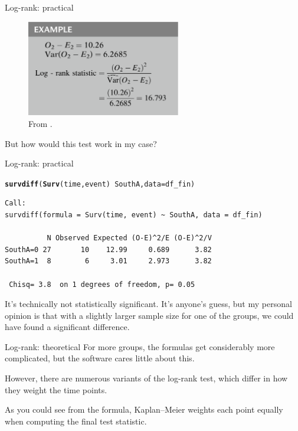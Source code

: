 \documentclass[12pt,english,pdf,xcolor=dvipsnames,aspectratio=169]{beamer}\usepackage[]{graphicx}\usepackage[]{xcolor}
\makeatletter
\newcommand{\hlopt}[1]{\textcolor[rgb]{0,0,0}{#1}}%
\newcommand{\hlstd}[1]{\textcolor[rgb]{0.345,0.345,0.345}{#1}}%
\newcommand{\hlkwc}[1]{\textcolor[rgb]{0.333,0.667,0.333}{#1}}%
\newcommand{\hlkwd}[1]{\textcolor[rgb]{0.737,0.353,0.396}{\textbf{#1}}}%
\newenvironment{kframe}{%
 \def\at@end@of@kframe{}%
 \ifinner\ifhmode%
  \def\at@end@of@kframe{\end{minipage}}%
  \begin{minipage}{\columnwidth}%
 \fi\fi%
 \def\FrameCommand##1{\hskip\@totalleftmargin \hskip-\fboxsep
 \colorbox{shadecolor}{##1}\hskip-\fboxsep
     \hskip-\linewidth \hskip-\@totalleftmargin \hskip\columnwidth}%
 \MakeFramed {\advance\hsize-\width
   \@totalleftmargin\z@ \linewidth\hsize
   \@setminipage}}%
 {\par\unskip\endMakeFramed%
 \at@end@of@kframe}
\newenvironment{knitrout}{}{} %
\makeatother
\begin{document}
\begin{frame}{Log-rank: practical}

\begin{figure}
\centering
\includegraphics[width=0.6\textwidth]{../03-graphs/01-07.png}
\caption*{From .}
\end{figure}

But how would this test work in my case?
\end{frame}



\begin{frame}[fragile]{Log-rank: practical}

\begin{knitrout}\scriptsize
{}\color{fgcolor}\begin{kframe}
\begin{alltt}
\hlkwd{survdiff}\hlstd{(}\hlkwd{Surv}\hlstd{(time, event)} \hlopt{~} \hlstd{SouthA,} \hlkwc{data} \hlstd{= df_fin)}
\end{alltt}
\begin{verbatim}
Call:
survdiff(formula = Surv(time, event) ~ SouthA, data = df_fin)

          N Observed Expected (O-E)^2/E (O-E)^2/V
SouthA=0 27       10    12.99     0.689      3.82
SouthA=1  8        6     3.01     2.973      3.82

 Chisq= 3.8  on 1 degrees of freedom, p= 0.05 
\end{verbatim}
\end{kframe}
\end{knitrout}

It's technically not statistically significant. It's anyone's guess, but my personal opinion is that with a slightly larger sample size for one of the groups, we could have found a significant difference.
\end{frame}




\begin{frame}{Log-rank: theoretical}
For more groups, the formulas get considerably more complicated, but the software cares little about this.\bigskip

However, there are numerous variants of the log-rank test, which differ in how they weight the time points.\bigskip

As you could see from the formula, Kaplan--Meier weights each point equally when computing the final test statistic.
\end{frame}
\end{document}
